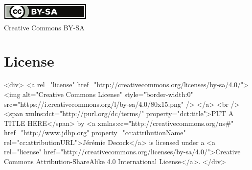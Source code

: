 \documentclass{article}
\begin{document}



\ifpdf

    \vfill %
    \begin{center}
        \href{http://creativecommons.org/licenses/by-sa/4.0/}{\includegraphics[width=.15\linewidth]{figs/cc_by_sa_small}}\\
        \small{Creative Commons BY-SA}
    \end{center}

\else

    \section*{License}\label{sec:license}

    \begin{rawhtml}

        <div>
            <a rel="license" href="http://creativecommons.org/licenses/by-sa/4.0/">
                <img alt="Creative Commons License" style="border-width:0" src="https://i.creativecommons.org/l/by-sa/4.0/80x15.png" />
            </a>
            <br />
            <span xmlns:dct="http://purl.org/dc/terms/" property="dct:title">PUT A TITLE HERE</span>
            by <a xmlns:cc="http://creativecommons.org/ns#" href="http://www.jdhp.org" property="cc:attributionName" rel="cc:attributionURL">Jérémie Decock</a>
            is licensed under a
            <a rel="license" href="http://creativecommons.org/licenses/by-sa/4.0/">Creative Commons Attribution-ShareAlike 4.0 International License</a>.
        </div>

    \end{rawhtml}
 



\fi
\end{document}
